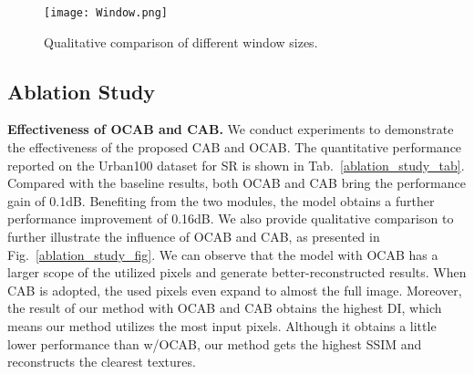 \documentclass[10pt,twocolumn,letterpaper]{article}
\begin{document}
\begin{table}[!t]
\center
\begin{center}
\caption{Quantitative comparison on PSNR(dB) of different window sizes.}
\vspace{-0.2cm}
\label{win_size_cmp_lab}
\end{center}
\vspace{-0.2cm}
\end{table}

\begin{figure}[!t]
\centering
\texttt{[image: Window.png]}
\vspace{-0.3cm}
\caption{Qualitative comparison of different window sizes.}
\vspace{-0.5cm}
\label{win_size_cmp_fig}
\end{figure}

\subsection{Ablation Study}
\noindent
\textbf{Effectiveness of OCAB and CAB.}
We conduct experiments to demonstrate the effectiveness of the proposed CAB and OCAB. The quantitative performance reported on the Urban100 dataset for  SR is shown in Tab.~\ref{ablation_study_tab}. 
Compared with the baseline results, both OCAB and CAB bring the performance gain of 0.1dB. Benefiting from the two modules, the model obtains a further performance improvement of 0.16dB. We also provide qualitative comparison to further illustrate the influence of OCAB and CAB, as presented in Fig.~\ref{ablation_study_fig}. We can observe that the model with OCAB has a larger scope of the utilized pixels and generate better-reconstructed results. When CAB is adopted, the used pixels even expand to almost the full image. Moreover, the result of our method with OCAB and CAB obtains the highest DI\cite{lam}, which means our method utilizes the most input pixels. Although it obtains a little lower performance than w/OCAB, our method gets the highest SSIM and reconstructs the clearest textures.
\end{document}
